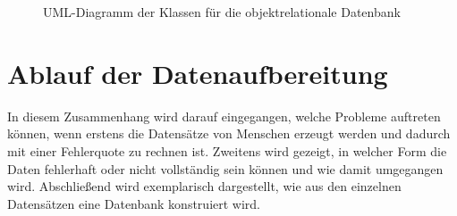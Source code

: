 \begin{figure}
\caption{UML-Diagramm der Klassen für die objektrelationale Datenbank}
\label{fig:uml-database}
\end{figure}

 
\section{Ablauf der Datenaufbereitung} \label{subchap:data-pipeline}

In diesem Zusammenhang wird darauf eingegangen, welche Probleme auftreten können, wenn erstens die Datensätze von Menschen erzeugt werden und dadurch mit einer Fehlerquote zu rechnen ist.
Zweitens wird gezeigt, in welcher Form die Daten fehlerhaft oder nicht vollständig sein können und wie damit umgegangen wird.
Abschließend wird exemplarisch dargestellt, wie aus den einzelnen Datensätzen eine Datenbank konstruiert wird.

